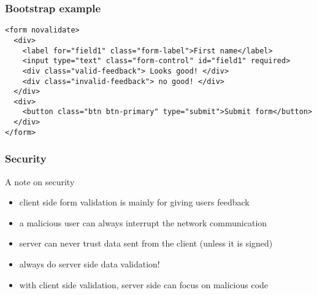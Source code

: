 \begin{frame}[fragile] \frametitle{Bootstrap example}
\begin{lstlisting}[style=htmlcssjs]
<form novalidate>
  <div>
    <label for="field1" class="form-label">First name</label>
    <input type="text" class="form-control" id="field1" required>
    <div class="valid-feedback"> Looks good! </div>
    <div class="invalid-feedback"> no good! </div>
  </div>
  <div>
    <button class="btn btn-primary" type="submit">Submit form</button>
  </div>
</form>
\end{lstlisting}
\end{frame}
\begin{frame}[fragile] \frametitle{Security}
A note on security
\begin{itemize}
  \item client side form validation is mainly for giving users feedback
  \item a malicious user can always interrupt the network communication
  \item server can never trust data sent from the client (unless it is signed)
  \item always do server side data validation!
  \item with client side validation, server side can focus on malicious code
\end{itemize}
\end{frame}

